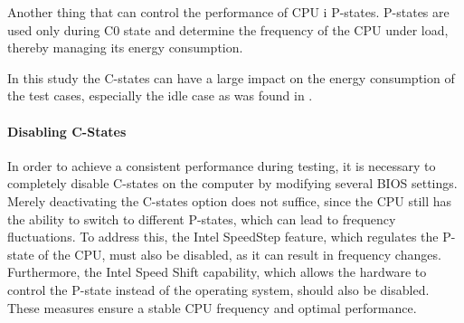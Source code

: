 Another thing that can control the performance of CPU i P-states. P-states are used only during C0 state and determine the frequency of the CPU under load, thereby managing its energy consumption.







In this study the C-states can have a large impact on the energy consumption of the test cases, especially the idle case as was found in \cite{biksbois}.

\paragraph{Disabling C-States}
In order to achieve a consistent performance during testing, it is necessary to completely disable C-states on the computer by modifying several BIOS settings. Merely deactivating the C-states option does not suffice, since the CPU still has the ability to switch to different P-states, which can lead to frequency fluctuations. To address this, the Intel SpeedStep\cite{IntelSpeedStep} feature, which regulates the P-state of the CPU, must also be disabled, as it can result in frequency changes. Furthermore, the Intel Speed Shift\cite{IntelSpeedShift} capability, which allows the hardware to control the P-state instead of the operating system, should also be disabled. These measures ensure a stable CPU frequency and optimal performance.
